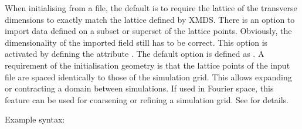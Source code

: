 \documentclass[letterpaper,10pt,english]{sphinxmanual}
\begin{document}
\ignorespaces 
\sphinxAtStartPar
When initialising from a file, the default is to require the lattice of the transverse dimensions to exactly match the lattice defined by XMDS.  There is an option to import data defined on a subset or superset of the lattice points.  Obviously, the dimensionality of the imported field still has to be correct.  This option is activated by defining the attribute .  The default option is defined as .  A requirement of the initialisation geometry is that the lattice points of the input file are spaced identically to those of the simulation grid.  This allows expanding or contracting a domain between simulations.  If used in Fourier space, this feature can be used for coarsening or refining a simulation grid.  See {\hyperref[\detokenize{advanced_topics:loosegeometrymatchingmode}]{}} for details.

\sphinxAtStartPar
Example syntax:
\end{document}
